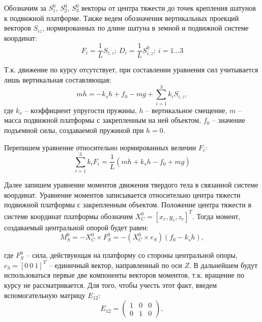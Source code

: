 Обозначим за $S_1^0$, $S_2^0$, $S_3^0$ векторы от центра тяжести до точек крепления шатунов к подвижной платформе. Также ведем обозначения вертикальных проекций векторов $S_{iz}$, нормированных по длине шатуна в земной и подвижной системе координат:
\begin{equation}
\label{eq:DynamicVerticaldPojections}
	F_i = \frac{1}{L}S_{i,z};~ D_i = \frac{1}{L}S_{i,z}^0;~i=1\dots3
\end{equation}

Т.к. движение по курсу отсутствует, при составлении уравнения сил учитывается лишь вертикальная составляющая:
\begin{equation}
\label{eq:DynamicVerticalForcesEq1}
	m\ddot{h} = -k_sh + f_0 - mg + \sum_{i=1}^3 k_iS_{i,z},
\end{equation}
где $k_s$ -- коэффициент упругости пружины, $h$ -- вертикальное смещение, $m$ -- масса подвижной платформы с закрепленным на ней объектом, $f_0$ -- значение подъемной силы, создаваемой пружиной при $h=0$.

Перепишем уравнение относительно нормированных величин $F_i$:
\begin{equation}
\label{eq:DynamicVerticalForcesEq2}
	\sum_{i=1}^3k_iF_i = \frac{1}{L}\left(m\ddot{h}+k_sh-f_0+mg\right)
\end{equation}

Далее запишем уравнение моментов движения твердого тела в связанной системе координат. Уравнение моментов записывается относительно центра тяжести подвижной платформы с закрепленным объектом. Положение центра тяжести в системе координат платформы обозначим $X^0_C = \left[x_c, y_c, z_c\right]^T$. Тогда момент, создаваемый центральной опорой будет равен:
\begin{equation}
\label{eq:TorqueFromCentralSupport}
M_S^0 = -X_C^0 \times F_S^0 = -\left(X_C^0 \times e_S\right)\left(f_0 - k_sh\right),
\end{equation}

где $F^0_S$ – сила, действующая на платформу со стороны центральной опоры, $e_3 = \left[0~0~1\right]^T$ -- единичный вектор, направленный по оси $Z$. В дальнейшем будут использоваться первые две компоненты векторов моментов, т.к. вращение по курсу не рассматривается. Для того, чтобы учесть этот факт, введем вспомогательную матрицу $E_{12}$:
\begin{equation}
\label{eq:AuxiliaryUnitMatrix}
E_{12} = \begin{pmatrix}
1 & 0 & 0 \\
0 & 1 & 0
\end{pmatrix},
\end{equation}

